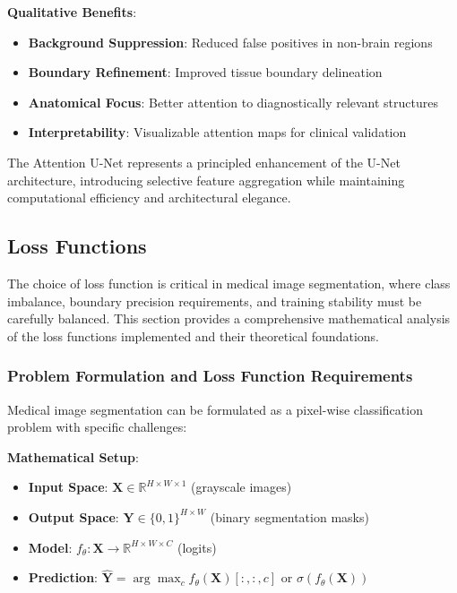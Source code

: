 \documentclass[12pt,a4paper]{article}
\begin{document}
\textbf{Qualitative Benefits}:
\begin{itemize}
    \item \textbf{Background Suppression}: Reduced false positives in non-brain regions
    \item \textbf{Boundary Refinement}: Improved tissue boundary delineation
    \item \textbf{Anatomical Focus}: Better attention to diagnostically relevant structures
    \item \textbf{Interpretability}: Visualizable attention maps for clinical validation
\end{itemize}

The Attention U-Net represents a principled enhancement of the U-Net architecture, introducing selective feature aggregation while maintaining computational efficiency and architectural elegance.

\subsection{Loss Functions}

The choice of loss function is critical in medical image segmentation, where class imbalance, boundary precision requirements, and training stability must be carefully balanced. This section provides a comprehensive mathematical analysis of the loss functions implemented and their theoretical foundations.

\subsubsection{Problem Formulation and Loss Function Requirements}

Medical image segmentation can be formulated as a pixel-wise classification problem with specific challenges:

\textbf{Mathematical Setup}:
\begin{itemize}
    \item \textbf{Input Space}: $\mathbf{X} \in \mathbb{R}^{H \times W \times 1}$ (grayscale images)
    \item \textbf{Output Space}: $\mathbf{Y} \in \{0, 1\}^{H \times W}$ (binary segmentation masks)
    \item \textbf{Model}: $f_\theta: \mathbf{X} \rightarrow \mathbb{R}^{H \times W \times C}$ (logits)
    \item \textbf{Prediction}: $\mathbf{\hat{Y}} = \arg\max_c f_\theta(\mathbf{X})[:,:,c]$ or $\sigma(f_\theta(\mathbf{X}))$
\end{itemize}
\end{document}
